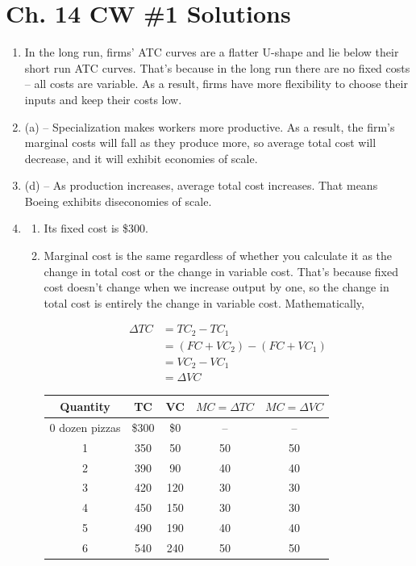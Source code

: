 \documentclass{article}
\begin{document}
\section*{Ch. 14 CW \#1 Solutions}

\begin{enumerate}

\item In the long run, firms' ATC curves are a flatter U-shape and lie below their short run ATC curves. That's because in the long run there are no fixed costs -- all costs are variable. As a result, firms have more flexibility to choose their inputs and keep their costs low.

\item (a) -- Specialization makes workers more productive. As a result, the firm's marginal costs will fall as they produce more, so average total cost will decrease, and it will exhibit economies of scale.

\item (d) -- As production increases, average total cost increases. That means Boeing exhibits diseconomies of scale. 

\item

	\begin{enumerate}
	
	\item Its fixed cost is \$300.
	
	\item Marginal cost is the same regardless of whether you calculate it as the change in total cost or the change in variable cost. That's because fixed cost doesn't change when we increase output by one, so the change in total cost is entirely the change in variable cost. Mathematically,
	
	\begin{align*}
	\Delta TC &= TC_2 - TC_1 \\
	&= (FC + VC_2) - (FC + VC_1) \\
	&= VC_2 - VC_1 \\
	&= \Delta VC
	\end{align*}
	
	\begin{center}
	\begin{tabular}{c | c | c | c | c}
	Quantity & TC & VC & $MC = \Delta TC$ & $MC = \Delta VC$ \\
	\hline
	0 dozen pizzas & \$300 & \$0 & -- & -- \\
	1 & 350 & 50  & 50 & 50 \\
	2 & 390 & 90 & 40 & 40 \\
	3 & 420 & 120 & 30 & 30 \\
	4 & 450 & 150 & 30 & 30 \\
	5 & 490 & 190 & 40 & 40 \\
	6 & 540 & 240 & 50 & 50 \\
	\end{tabular}
	\end{center}
	

\end{enumerate}
\end{enumerate}
\end{document}
